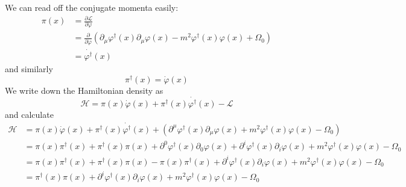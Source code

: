 \documentclass[fontsize=11pt]{scrartcl} %
\numberwithin{equation}{section} %
\numberwithin{figure}{section} %
\numberwithin{table}{section} %
\begin{document}
We can read off the conjugate momenta easily:
\[
    \begin{aligned}
        \pi(x) &= \frac{\partial\mathscr{L}}{\partial\dot{\varphi}}\\
        &=
        \frac{\partial}{\partial\dot{\varphi}}
        (\partial_{\mu}\varphi^{\dagger}(x)\partial_{\mu}\varphi(x) -
        m^2\varphi^{\dagger}(x)\varphi(x) + \Omega_0)\\
        &= \dot{\varphi^{\dagger}}(x)
    \end{aligned}
\]
and similarly
\[
    \pi^{\dagger}(x) = \dot{\varphi}(x)
\]
We write down the Hamiltonian density as
\[
    \mathscr{H} = \pi(x)\dot{\varphi}(x) +
    \pi^{\dagger}(x)\dot{\varphi^{\dagger}}(x) - \mathscr{L}
\]
and calculate
\[
    \begin{aligned}
        \mathscr{H} &= \pi(x)\dot{\varphi}(x)
        + \pi^{\dagger}(x)\dot{\varphi^{\dagger}}(x) 
        + \left( \partial^{\mu}\varphi^{\dagger}(x)\partial_{\mu}\varphi(x)
        + m^2 \varphi^{\dagger}(x)\varphi(x) - \Omega_0\right)\\
        &=\pi(x)\pi^{\dagger}(x) + \pi^{\dagger}(x)\pi(x)
        +\partial^{0}\varphi^{\dagger}(x)\partial_{0}\varphi(x)
        +\partial^{i}\varphi^{\dagger}(x)\partial_{i}\varphi(x)
        +m^2\varphi^{\dagger}(x)\varphi(x) - \Omega_0\\
        &=\pi(x)\pi^{\dagger}(x) + \pi^{\dagger}(x)\pi(x)
        -\pi(x)\pi^{\dagger}(x)
        +\partial^{i}\varphi^{\dagger}(x)\partial_{i}\varphi(x)
        +m^2\varphi^{\dagger}(x)\varphi(x) - \Omega_0\\
        &=\pi^{\dagger}(x)\pi(x)
        +\partial^{i}\varphi^{\dagger}(x)\partial_{i}\varphi(x)
        +m^2\varphi^{\dagger}(x)\varphi(x) - \Omega_0\\
    \end{aligned}
\]
\end{document}

